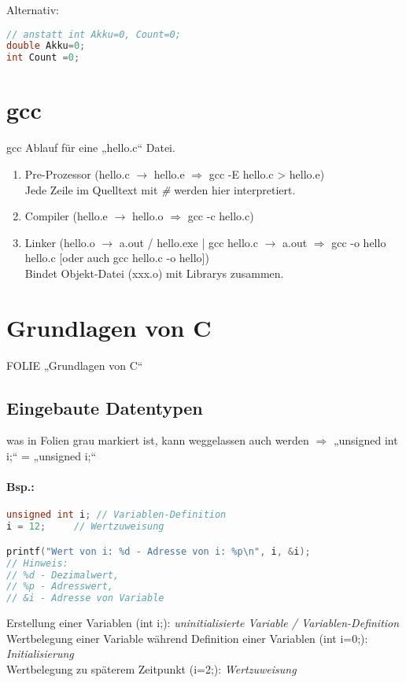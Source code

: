Alternativ:
\begin{lstlisting}[language=C]
// anstatt int Akku=0, Count=0;
double Akku=0;
int Count =0;
\end{lstlisting}

\section{gcc}

gcc Ablauf für eine „hello.c“ Datei.

\begin{enumerate}
\item Pre-Prozessor (hello.c $\rightarrow$ hello.e $\Rightarrow$ gcc -E hello.c > hello.e) \\
Jede Zeile im Quelltext mit \emph{\#} werden hier interpretiert.
\item Compiler (hello.e $\rightarrow$ hello.o $\Rightarrow$ gcc -c hello.c)
\item Linker (hello.o $\rightarrow$ a.out / hello.exe | gcc hello.c $\rightarrow$ a.out $\Rightarrow$ gcc -o hello hello.c [oder auch gcc hello.c -o hello])\\
Bindet Objekt-Datei (xxx.o) mit Librarys zusammen.
\end{enumerate}

\section{Grundlagen von C}

FOLIE „Grundlagen von C“

\subsection{Eingebaute Datentypen}
was in Folien grau markiert ist, kann weggelassen auch werden $\Rightarrow$ „unsigned int i;“ = „unsigned i;“

\paragraph{Bsp.:}

\begin{lstlisting}[language=C]
unsigned int i;	// Variablen-Definition
i = 12;		// Wertzuweisung

printf("Wert von i: %d - Adresse von i: %p\n", i, &i);
// Hinweis: 
// %d - Dezimalwert, 
// %p - Adresswert, 
// &i - Adresse von Variable
\end{lstlisting}
Erstellung einer Variablen (int i;): \emph{uninitialisierte Variable / Variablen-Definition}\\
Wertbelegung einer Variable während Definition einer Variablen (int i=0;): \emph{Initialisierung}\\
Wertbelegung zu späterem Zeitpunkt (i=2;): \emph{Wertzuweisung}

